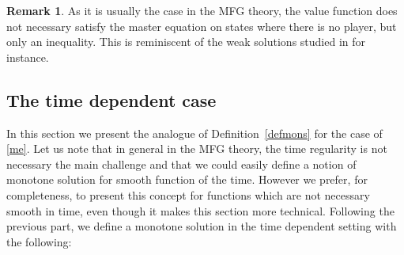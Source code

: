 \documentclass[10pt]{amsart}
\theoremstyle{definition}
\newtheorem{Rem}{Remark}[section]
\begin{document}
\begin{Rem}
As it is usually the case in the MFG theory, the value function does not necessary satisfy the master equation on states where there is no player, but only an inequality. This is reminiscent of the weak solutions studied in \cite{cardaliaguet2015second} for instance.
\end{Rem}

\subsection{The time dependent case}
In this section we present the analogue of Definition~\ref{defmons} for the case of \eqref{me}. Let us note that in general in the MFG theory, the time regularity is not necessary the main challenge and that we could easily define a notion of monotone solution for smooth function of the time. However we prefer, for completeness, to present this concept for functions which are not necessary smooth in time, even though it makes this section more technical. Following the previous part, we define a monotone solution in the time dependent setting with the following:
\end{document}
